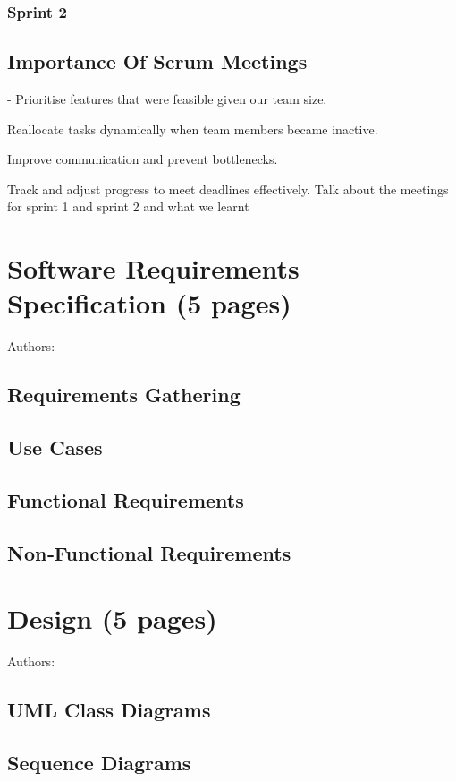 \documentclass[12pt,a4paper]{article}
\begin{document}
\subsubsection{Sprint 2}
\subsection{Importance Of Scrum Meetings}
- Prioritise features that were feasible given our team size.

Reallocate tasks dynamically when team members became inactive.

Improve communication and prevent bottlenecks.

Track and adjust progress to meet deadlines effectively.
Talk about the meetings for sprint 1 and sprint 2 and what we learnt
\label{sec:agile}


\section{Software Requirements Specification (5 pages)}
Authors:
\label{sec:requirements}
\subsection{Requirements Gathering}

\subsection{Use Cases}

\subsection{Functional Requirements}

\subsection{Non‑Functional Requirements}


\section{Design (5 pages)}
Authors:
\label{sec:design}
\subsection{UML Class Diagrams}

\subsection{Sequence Diagrams}
\end{document}
